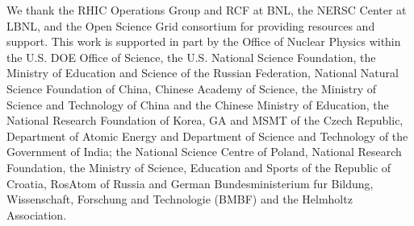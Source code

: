 \documentclass[%
 reprint,	
 amsmath,amssymb,
 aps,
 prc,
]{revtex4-1}
\begin{document}
We thank the RHIC Operations Group and RCF at BNL, the NERSC Center at LBNL, and the Open Science Grid consortium for providing resources and support. This work is supported in part by the Office of Nuclear Physics within the U.S. DOE Office of Science, the U.S. National Science Foundation, the Ministry of Education and Science of the Russian Federation, National Natural Science Foundation of China, Chinese Academy of Science, the Ministry of Science and Technology of China and the Chinese Ministry of Education, the National Research Foundation of Korea, GA and MSMT of the Czech Republic, Department of Atomic Energy and Department of Science and Technology of the Government of India; the National Science Centre of Poland, National Research Foundation, the Ministry of Science, Education and Sports of the Republic of Croatia, RosAtom of Russia and German Bundesministerium fur Bildung, Wissenschaft, Forschung and Technologie (BMBF) and the Helmholtz Association.


\end{document}
